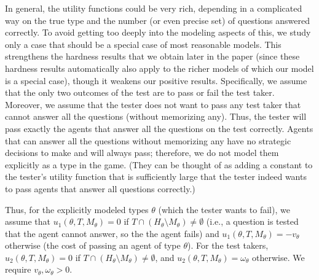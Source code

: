 \documentclass{article}
\begin{document}
In general, the utility functions could be very rich, depending in a
complicated way on the true type and the number (or even precise set) of
questions answered correctly.  To avoid getting too deeply into the
modeling aspects of this, we study only a case that should be a
special case of most reasonable models.  This strengthens the hardness
results that we obtain later in the paper (since these hardness results
automatically also apply to the richer models of which our model is a
special case), though it weakens our positive results.  Specifically, we
assume that the only two outcomes of the test are to pass or fail the test
taker.  Moreover, we assume that the tester does not want to pass any test
taker that cannot answer all the questions (without memorizing any).  Thus,
the tester will pass exactly the agents that answer all the questions on
the test correctly.  Agents that can answer all the questions without
memorizing any have no strategic decisions to make and will always pass;
therefore, we do not model them explicitly as a type in the game.  (They
can be thought of as adding a constant to the tester's utility function
that is sufficiently large that the tester indeed wants to pass agents that
answer all questions correctly.)  

Thus, for the explicitly modeled types
$\theta$ (which the tester wants to fail), we assume that $u_1(\theta, T,
M_\theta) = 0$ if $T \cap (H_\theta \setminus M_\theta) \neq \emptyset$
(i.e., a question is tested that the agent cannot answer, so the 
the agent fails) and $u_1(\theta, T, M_\theta) = -v_\theta$ otherwise
(the cost of passing an agent of type $\theta$).  For the test takers,
$u_2(\theta, T,
M_\theta) = 0$ if $T \cap (H_\theta \setminus M_\theta) \neq \emptyset$,
and $u_2(\theta, T, M_\theta) = \omega_\theta$ otherwise.  We require
$v_\theta, \omega_\theta >0$.


\end{document}
